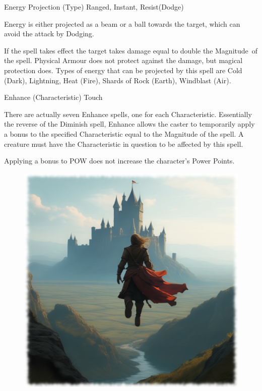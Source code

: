 \begin{rpg-spell}
{Energy Projection (Type)}
{Ranged, Instant, Resist(Dodge)}

Energy is either projected as a beam or a ball towards the target, which can avoid the attack by Dodging.

If the spell takes effect the target takes damage equal to double the Magnitude of the spell. Physical Armour does not protect against the damage, but magical protection does. Types of energy that can be projected by this spell are Cold (Dark), Lightning, Heat (Fire), Shards of Rock (Earth), Windblast (Air).
\end{rpg-spell}


\begin{rpg-spell}
{Enhance (Characteristic)}
{Touch}

There are actually seven Enhance spells, one for each Characteristic. Essentially the reverse of the Diminish spell, Enhance allows the caster to temporarily apply a bonus to the specified Characteristic equal to the Magnitude of the spell. A creature must have the Characteristic in question to be affected by this spell. 

Applying a bonus to POW does not increase the character’s Power Points. 
\end{rpg-spell}

\begin{figure}[h]
\begin{center}
  \includegraphics[scale=0.23]{img/ai-images/human-flying.png}
\end{center}
\end{figure}

